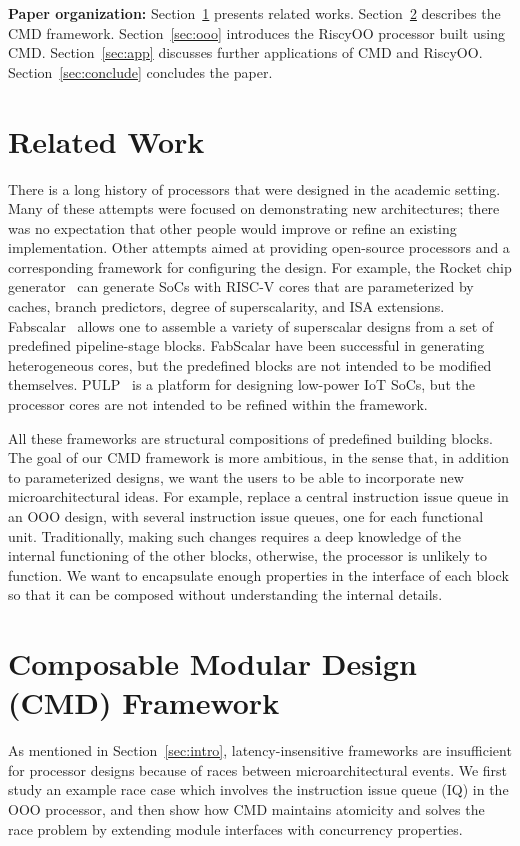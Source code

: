 \documentclass[conference]{IEEEtran}
\begin{document}
\noindent\textbf{Paper organization:}
Section~\ref{sec:related} presents related works.
Section~\ref{sec:cmd} describes the CMD framework.
Section~\ref{sec:ooo} introduces the RiscyOO processor built using CMD.
Section~\ref{sec:app} discusses further applications of CMD and RiscyOO.
Section~\ref{sec:conclude} concludes the paper.

\section{Related Work}\label{sec:related}
There is a long history of processors that were designed in the academic setting.
Many of these attempts were focused on demonstrating new architectures; there was no expectation that other people would improve or refine an existing implementation.
Other attempts aimed at providing open-source processors and a corresponding framework for configuring the design.
For example, the Rocket chip generator~\cite{rocketchip} can generate SoCs with RISC-V cores that are parameterized by caches, branch predictors, degree of superscalarity, and ISA extensions.
Fabscalar~\cite{fabscalar} allows one to assemble a variety of superscalar designs from a set of predefined pipeline-stage blocks.
FabScalar have been successful in generating heterogeneous cores, but the predefined blocks are not intended to be modified themselves.
PULP~\cite{pulp} is a platform for designing low-power IoT SoCs, but the processor cores are not intended to be refined within the framework.

All these frameworks are structural compositions of predefined building blocks.
The goal of our CMD framework is more ambitious, in the sense that, in addition to parameterized designs, we want the users to be able to incorporate new microarchitectural ideas.
For example, replace a central instruction issue queue in an OOO design, with several instruction issue queues, one for each functional unit.
Traditionally, making such changes requires a deep knowledge of the internal functioning of the other blocks, otherwise, the processor is unlikely to function. 
We want to encapsulate enough properties in the interface of each block so that it can be composed without understanding the internal details.

\section{Composable Modular Design (CMD) Framework}\label{sec:cmd}

As mentioned in Section~\ref{sec:intro}, latency-insensitive frameworks are insufficient for processor designs because of races between microarchitectural events.
We first study an example race case which involves the instruction issue queue (IQ) in the OOO processor, and then show how CMD maintains atomicity and solves the race problem by extending module interfaces with concurrency properties.
\end{document}
